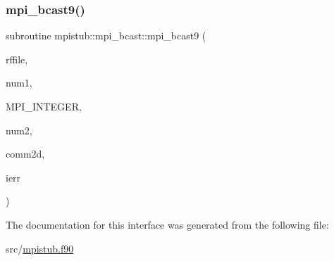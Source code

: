 \subsubsection{\texorpdfstring{mpi\_bcast9()}{mpi\_bcast9()}}
{\footnotesize\ttfamily subroutine mpistub\+::mpi\+\_\+bcast\+::mpi\+\_\+bcast9 (\begin{DoxyParamCaption}\item[{double complex, dimension(\+:)}]{rffile,  }\item[{}]{num1,  }\item[{}]{M\+P\+I\+\_\+\+I\+N\+T\+E\+G\+ER,  }\item[{}]{num2,  }\item[{integer}]{comm2d,  }\item[{}]{ierr }\end{DoxyParamCaption})}



The documentation for this interface was generated from the following file\+:\begin{DoxyCompactItemize}
\item 
src/\mbox{\hyperlink{mpistub_8f90}{mpistub.\+f90}}\end{DoxyCompactItemize}
